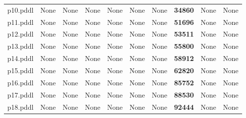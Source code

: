 \documentclass{article}
\begin{document}
\begin{tabular}{@{}lrrrrrrrrr@{}}
p10.pddl & \multicolumn{1}{|l|}{None} & \multicolumn{1}{|l|}{None} & \multicolumn{1}{|l|}{None} & \multicolumn{1}{|l|}{None} & \multicolumn{1}{|l|}{None} & \multicolumn{1}{|l|}{None} & \textbf{34860} & \multicolumn{1}{|l|}{None} & \multicolumn{1}{|l|}{None} \\
p11.pddl & \multicolumn{1}{|l|}{None} & \multicolumn{1}{|l|}{None} & \multicolumn{1}{|l|}{None} & \multicolumn{1}{|l|}{None} & \multicolumn{1}{|l|}{None} & \multicolumn{1}{|l|}{None} & \textbf{51696} & \multicolumn{1}{|l|}{None} & \multicolumn{1}{|l|}{None} \\
p12.pddl & \multicolumn{1}{|l|}{None} & \multicolumn{1}{|l|}{None} & \multicolumn{1}{|l|}{None} & \multicolumn{1}{|l|}{None} & \multicolumn{1}{|l|}{None} & \multicolumn{1}{|l|}{None} & \textbf{53511} & \multicolumn{1}{|l|}{None} & \multicolumn{1}{|l|}{None} \\
p13.pddl & \multicolumn{1}{|l|}{None} & \multicolumn{1}{|l|}{None} & \multicolumn{1}{|l|}{None} & \multicolumn{1}{|l|}{None} & \multicolumn{1}{|l|}{None} & \multicolumn{1}{|l|}{None} & \textbf{55800} & \multicolumn{1}{|l|}{None} & \multicolumn{1}{|l|}{None} \\
p14.pddl & \multicolumn{1}{|l|}{None} & \multicolumn{1}{|l|}{None} & \multicolumn{1}{|l|}{None} & \multicolumn{1}{|l|}{None} & \multicolumn{1}{|l|}{None} & \multicolumn{1}{|l|}{None} & \textbf{58912} & \multicolumn{1}{|l|}{None} & \multicolumn{1}{|l|}{None} \\
p15.pddl & \multicolumn{1}{|l|}{None} & \multicolumn{1}{|l|}{None} & \multicolumn{1}{|l|}{None} & \multicolumn{1}{|l|}{None} & \multicolumn{1}{|l|}{None} & \multicolumn{1}{|l|}{None} & \textbf{62820} & \multicolumn{1}{|l|}{None} & \multicolumn{1}{|l|}{None} \\
p16.pddl & \multicolumn{1}{|l|}{None} & \multicolumn{1}{|l|}{None} & \multicolumn{1}{|l|}{None} & \multicolumn{1}{|l|}{None} & \multicolumn{1}{|l|}{None} & \multicolumn{1}{|l|}{None} & \textbf{85752} & \multicolumn{1}{|l|}{None} & \multicolumn{1}{|l|}{None} \\
p17.pddl & \multicolumn{1}{|l|}{None} & \multicolumn{1}{|l|}{None} & \multicolumn{1}{|l|}{None} & \multicolumn{1}{|l|}{None} & \multicolumn{1}{|l|}{None} & \multicolumn{1}{|l|}{None} & \textbf{88530} & \multicolumn{1}{|l|}{None} & \multicolumn{1}{|l|}{None} \\
p18.pddl & \multicolumn{1}{|l|}{None} & \multicolumn{1}{|l|}{None} & \multicolumn{1}{|l|}{None} & \multicolumn{1}{|l|}{None} & \multicolumn{1}{|l|}{None} & \multicolumn{1}{|l|}{None} & \textbf{92444} & \multicolumn{1}{|l|}{None} & \multicolumn{1}{|l|}{None} \\

\end{tabular}
\end{document}
